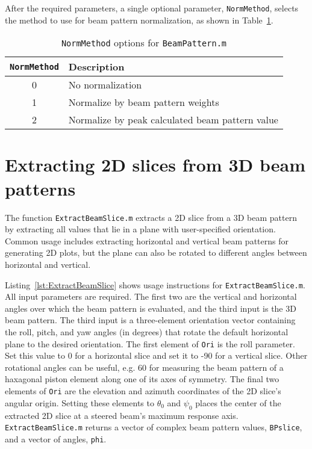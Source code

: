 After the required parameters, a single optional parameter, \texttt{NormMethod},  selects the method to use for beam pattern normalization, as shown in Table~\ref{tab:BeamPatternNormMethod}.

\begin{table}[!ht]
	\begin{center}
		\caption{\texttt{NormMethod} options for \texttt{BeamPattern.m}}
		\label{tab:BeamPatternNormMethod}
		\begin{tabular}{c|l} 
			\texttt{NormMethod} & \textbf{Description} \\
			\hline
			0 & No normalization\\
			1 & Normalize by beam pattern weights \\
			2 & Normalize by peak calculated beam pattern value\\
		\end{tabular}
	\end{center}
\end{table}

\clearpage



\section{Extracting 2D slices from 3D beam patterns}

The function \texttt{ExtractBeamSlice.m} extracts a 2D slice from a 3D beam pattern by extracting all values that lie in a plane with user-specified orientation. Common usage includes extracting horizontal and vertical beam patterns for generating 2D plots, but the plane can also be rotated to different angles between horizontal and vertical. 

Listing~\ref{lst:ExtractBeamSlice} shows usage instructions for \texttt{ExtractBeamSlice.m}. All input parameters are required. The first two are the vertical and horizontal angles over which the beam pattern is evaluated, and the third input is the 3D beam pattern. The third input is a three-element orientation vector containing the roll, pitch, and yaw angles (in degrees) that rotate the default horizontal plane to the desired orientation. The first element of \texttt{Ori} is the roll parameter. Set this value to 0 for a horizontal slice and set it to -90 for a vertical slice. Other rotational angles can be useful, e.g. 60 for measuring the beam pattern of a haxagonal piston element along one of its axes of symmetry. The final two elements of \texttt{Ori} are the elevation and azimuth coordinates of the 2D slice's angular origin. Setting these elements to $\theta_0$ and $\psi_0$ places the center of the extracted 2D slice at a steered beam's maximum response axis. \texttt{ExtractBeamSlice.m} returns a vector of complex beam pattern values, \texttt{BPslice},  and a vector of angles, \texttt{phi}.

